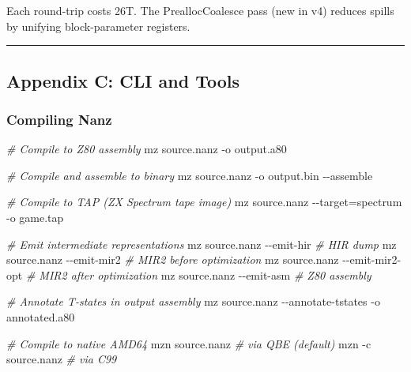 \documentclass[
  11pt,
]{article}
\newenvironment{Shaded}{}{}
\newcommand{\AttributeTok}[1]{\textcolor[rgb]{0.49,0.56,0.16}{#1}}
\newcommand{\CommentTok}[1]{\textcolor[rgb]{0.38,0.63,0.69}{\textit{#1}}}
\newcommand{\ExtensionTok}[1]{#1}
\newcommand{\NormalTok}[1]{#1}
\newcommand{\OperatorTok}[1]{\textcolor[rgb]{0.40,0.40,0.40}{#1}}
\begin{document}
Each round-trip costs 26T. The PreallocCoalesce pass (new in v4) reduces
spills by unifying block-parameter registers.

\begin{center}\rule{0.5\linewidth}{0.5pt}\end{center}

\subsection{Appendix C: CLI and Tools}\label{appendix-c-cli-and-tools}

\subsubsection{Compiling Nanz}\label{compiling-nanz}

\begin{Shaded}
\begin{Highlighting}[]
\CommentTok{\# Compile to Z80 assembly}
\ExtensionTok{mz}\NormalTok{ source.nanz }\AttributeTok{{-}o}\NormalTok{ output.a80}

\CommentTok{\# Compile and assemble to binary}
\ExtensionTok{mz}\NormalTok{ source.nanz }\AttributeTok{{-}o}\NormalTok{ output.bin }\AttributeTok{{-}{-}assemble}

\CommentTok{\# Compile to TAP (ZX Spectrum tape image)}
\ExtensionTok{mz}\NormalTok{ source.nanz }\AttributeTok{{-}{-}target}\OperatorTok{=}\NormalTok{spectrum }\AttributeTok{{-}o}\NormalTok{ game.tap}

\CommentTok{\# Emit intermediate representations}
\ExtensionTok{mz}\NormalTok{ source.nanz }\AttributeTok{{-}{-}emit{-}hir}        \CommentTok{\# HIR dump}
\ExtensionTok{mz}\NormalTok{ source.nanz }\AttributeTok{{-}{-}emit{-}mir2}       \CommentTok{\# MIR2 before optimization}
\ExtensionTok{mz}\NormalTok{ source.nanz }\AttributeTok{{-}{-}emit{-}mir2{-}opt}   \CommentTok{\# MIR2 after optimization}
\ExtensionTok{mz}\NormalTok{ source.nanz }\AttributeTok{{-}{-}emit{-}asm}        \CommentTok{\# Z80 assembly}

\CommentTok{\# Annotate T{-}states in output assembly}
\ExtensionTok{mz}\NormalTok{ source.nanz }\AttributeTok{{-}{-}annotate{-}tstates} \AttributeTok{{-}o}\NormalTok{ annotated.a80}

\CommentTok{\# Compile to native AMD64}
\ExtensionTok{mzn}\NormalTok{ source.nanz                  }\CommentTok{\# via QBE (default)}
\ExtensionTok{mzn} \AttributeTok{{-}c}\NormalTok{ source.nanz               }\CommentTok{\# via C99}
\end{Highlighting}
\end{Shaded}
\end{document}
